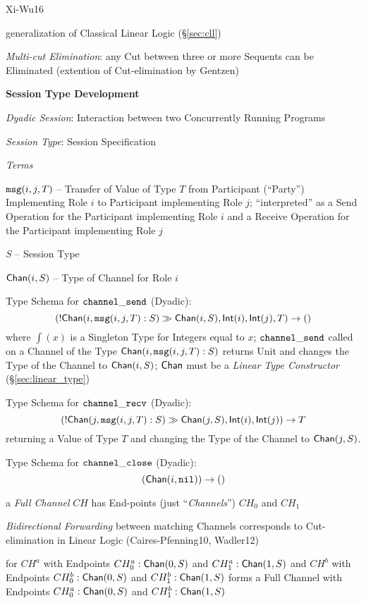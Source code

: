 \asterism

Xi-Wu16

generalization of Classical Linear Logic (\S\ref{sec:cll})

\emph{Multi-cut Elimination}: any Cut between three or more Sequents
can be Eliminated (extention of Cut-elimination by Gentzen)


\textbf{Session Type Development}

\emph{Dyadic Session}: Interaction between two Concurrently Running Programs

\emph{Session Type}: Session Specification

\emph{Terms}

$\mathtt{msg}(i,j,T)$ -- Transfer of Value of Type $T$ from Participant
(``Party'') Implementing Role $i$ to Participant implementing Role
$j$; ``interpreted'' as a Send Operation for the Participant
implementing Role $i$ and a Receive Operation for the Participant
implementing Role $j$

$S$ -- Session Type

$\mathsf{Chan}(i,S)$ -- Type of Channel for Role $i$

Type Schema for $\mathtt{channel\_send}$ (Dyadic):
\[
  (!\mathsf{Chan} (i, \mathtt{msg}(i,j,T):S) \gg \mathsf{Chan}(i,S), \mathsf{Int}(i), \mathsf{Int}(j), T)
    \rightarrow \mathsf{()}
\]
where $\int(x)$ is a Singleton Type for Integers equal to $x$;
$\mathtt{channel\_send}$ called on a Channel of the Type
$\mathsf{Chan}(i, \mathtt{msg}(i,j,T):S)$ returns Unit and changes the
Type of the Channel to $\mathsf{Chan}(i,S)$; $\mathsf{Chan}$ must be a
\emph{Linear Type Constructor} (\S\ref{sec:linear_type})

Type Schema for $\mathtt{channel\_recv}$ (Dyadic):
\[
  (!\mathsf{Chan} (j, \mathtt{msg}(i,j,T):S) \gg \mathsf{Chan}(j,S), \mathsf{Int}(i), \mathsf{Int}(j))
    \rightarrow T
\]
returning a Value of Type $T$ and changing the Type of the Channel to
$\mathsf{Chan}(j,S)$.

Type Schema for $\mathtt{channel\_close}$ (Dyadic):
\[
  (\mathsf{Chan}(i, \mathtt{nil})) \rightarrow \mathsf{()}
\]

a \emph{Full Channel} $CH$ has End-points (just ``\emph{Channels}'')
$CH_0$ and $CH_1$


\emph{Bidirectional Forwarding} between matching Channels corresponds
to Cut-elimination in Linear Logic (Caires-Pfenning10, Wadler12)

for $CH^a$ with Endpoints $CH^a_0 : \mathsf{Chan}(0,S)$ and $CH^a_1 :
\mathsf{Chan}(1,S)$ and $CH^b$ with Endpoints $CH^b_0 : \mathsf{Chan}(0,S)$ and
$CH^b_1 : \mathsf{Chan}(1,S)$ forms a Full Channel with Endpoints $CH^a_0 :
\mathsf{Chan}(0,S)$ and $CH^b_1 : \mathsf{Chan}(1,S)$


